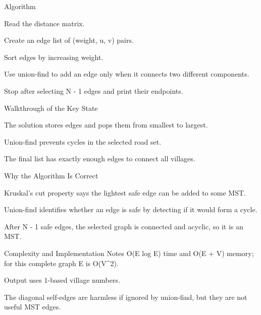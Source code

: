 \documentclass[aspectratio=169,11pt]{beamer}
\begin{document}
\begin{frame}{Algorithm}
\begin{tightitemize}
  \item Read the distance matrix.
  \item Create an edge list of (weight, u, v) pairs.
  \item Sort edges by increasing weight.
  \item Use union-find to add an edge only when it connects two different components.
  \item Stop after selecting N - 1 edges and print their endpoints.
\end{tightitemize}
\end{frame}

\begin{frame}{Walkthrough of the Key State}
\begin{tightitemize}
  \item The solution stores edges and pops them from smallest to largest.
  \item Union-find prevents cycles in the selected road set.
  \item The final list has exactly enough edges to connect all villages.
\end{tightitemize}
\end{frame}

\begin{frame}{Why the Algorithm Is Correct}
\begin{tightitemize}
  \item Kruskal's cut property says the lightest safe edge can be added to some MST.
  \item Union-find identifies whether an edge is safe by detecting if it would form a cycle.
  \item After N - 1 safe edges, the selected graph is connected and acyclic, so it is an MST.
\end{tightitemize}
\end{frame}

\begin{frame}{Complexity and Implementation Notes}
\small
{} O(E log E) time and O(E + V) memory; for this complete graph E is O(V\textasciicircum{}2).

\vspace{0.3cm}
\begin{tightitemize}
  \item Output uses 1-based village numbers.
  \item The diagonal self-edges are harmless if ignored by union-find, but they are not useful MST edges.
\end{tightitemize}
\end{frame}
\end{document}
